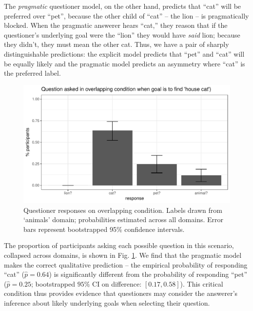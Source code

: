 \documentclass[12pt, floatsintext, jou]{apa6}
\begin{document}
The \emph{pragmatic} questioner model, on the other hand, predicts that ``cat'' will be preferred over ``pet'', because the other child of ``cat'' -- the lion -- is pragmatically blocked. When the pragmatic answerer hears ``cat,'' they reason that if the questioner's underlying goal were the ``lion'' they would have \emph{said} lion; because they didn't, they must mean the other cat. Thus, we have a pair of sharply distinguishable predictions: the explicit model predicts that ``pet'' and ``cat'' will be equally likely and the pragmatic model predicts an asymmetry where ``cat'' is the preferred label. 

\begin{figure}[t!]
\begin{center}
\includegraphics[scale=.46]{OverlappingModelComparison.pdf}
\end{center}
\caption{Questioner responses on overlapping condition. Labels drawn from `animals' domain; probabilities estimated across all domains. Error bars represent bootstrapped 95\% confidence intervals.}
\label{fig:Exp4ZoomedIn}
\end{figure}

The proportion of participants asking each possible question in this scenario, collapsed across domains, is shown in Fig. \ref{fig:Exp4ZoomedIn}. We find that the pragmatic model makes the correct qualitative prediction -- the empirical probability of responding ``cat'' ($\hat{p} = 0.64$) is significantly different from the  probability of responding ``pet'' ($\hat{p} = 0.25$; bootstrapped $95\%$ CI on difference: $[0.17, 0.58]$). This critical condition thus provides evidence that questioners may consider the answerer's inference about likely underlying goals when selecting their question. 
\end{document}
